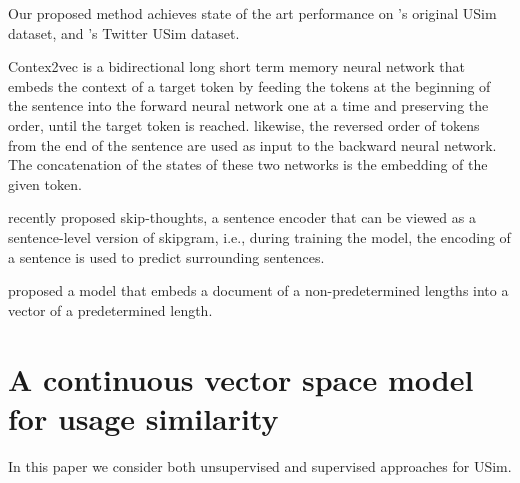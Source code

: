 \documentclass[11pt]{article}
\newcommand{\poscite}[1]{\citeauthor{#1}'s \citeyearpar{#1}}
\begin{document}

Our proposed method achieves state of the art performance on
\poscite{Erk2009b} original USim dataset, and \poscite{Gella+:2013}
Twitter USim dataset.


Contex2vec is a bidirectional long short term memory neural network that embeds the context of a target token by feeding the tokens at the beginning of the sentence into the forward neural network one at a time and preserving the order, until the target token is reached. likewise, the reversed order of tokens from the end of the sentence are used as input to the backward neural network. The concatenation of the states of these two networks is the embedding of the given token. 

\cite{Kiros+:2015} recently proposed skip-thoughts, a sentence encoder
that can be viewed as a sentence-level version of skipgram, i.e.,
during training the model, the encoding of a sentence is used to
predict surrounding sentences.

\cite{Mikolov+:2013a} proposed a model that embeds a document of a non-predetermined lengths into a vector of a predetermined length. 










\section{A continuous vector space model for usage similarity\label{sec:model}}


In this paper we consider both unsupervised and supervised approaches
for USim.
\end{document}
